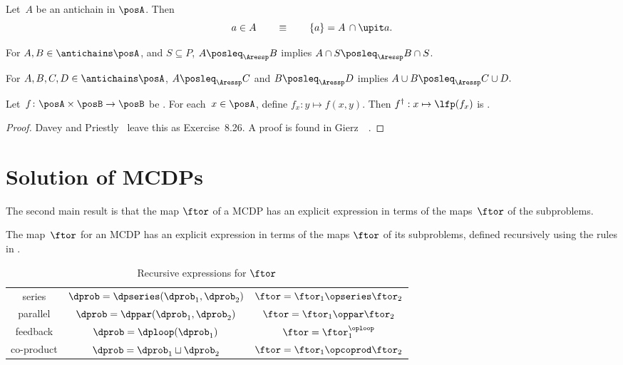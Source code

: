 \begin{lemma}
\label{lem:antichain-write}Let~$A$ be an antichain in $\posA$.
Then
\[
a\in A\qquad\equiv\qquad\{a\}=A\,\cap\upit a.
\]
\end{lemma}

\begin{lemma}
\label{lem:antichain_inter}For $A,B\in\antichains\posA$, and $S\subseteq P$,
$A\posleq_{\Aressp}B$ implies $A\cap S\posleq_{\Aressp}B\cap S$.
\end{lemma}

\begin{lemma}
\label{lem:antichain_union}For $A,B,C,D\in\antichains\posA$, $A\posleq_{\Aressp}C$
and $B\posleq_{\Aressp}D$ implies $A\cup B\posleq_{\Aressp}C\cup D.$
\end{lemma}

\begin{lemma}
\label{lem:dagger}Let~$f\colon\posA\times\posB\rightarrow\posB$
be \scottcontinuous. For each~$x\in\posA$, define $f_{x}:y\mapsto f(x,y).$
Then $f^{\dagger}:x\mapsto\lfp(f_{x})$ is \scottcontinuous.
\end{lemma}
\begin{proof}
Davey and Priestly~\cite{davey02} leave this as Exercise~8.26.
A proof is found in Gierz~\etal~\cite[Exercise II-2.29]{gierz03continuous}.
\end{proof}




\section{Solution of MCDPs\label{sec:Solution-of-Monotone}}

The second main result is that the map $\ftor$ of a MCDP has an explicit
expression in terms of the maps~$\ftor$ of the subproblems.

\noindent

\begin{theorem}
\label{thm:CDP-solvig}The map~$\ftor$ for an MCDP has an explicit
expression in terms of the maps $\ftor$ of its subproblems, defined
recursively using the rules in .
\end{theorem}

\begin{table}[h]
\begin{centering}
\caption{Recursive expressions for $\ftor$\label{tab:Correspondence}}
\par\end{centering}
\centering{}\setlength\extrarowheight{5pt}\normalsize
\begin{tabular}{ccc}
series & $\dprob=\dpseries(\dprob_{1},\dprob_{2})$ & $\ftor=\ftor_{1}\opseries\ftor_{2}$\tabularnewline
parallel & $\dprob=\dppar(\dprob_{1},\dprob_{2})$ & $\ftor=\ftor_{1}\oppar\ftor_{2}$\tabularnewline
feedback & $\dprob=\dploop(\dprob_{1})$ & $\ftor=\ftor_{1}^{\oploop}$\tabularnewline
co-product & $\dprob=\dprob_{1}\sqcup\dprob_{2}$ & $\ftor=\ftor_{1}\opcoprod\ftor_{2}$\tabularnewline
\end{tabular}
\end{table}

